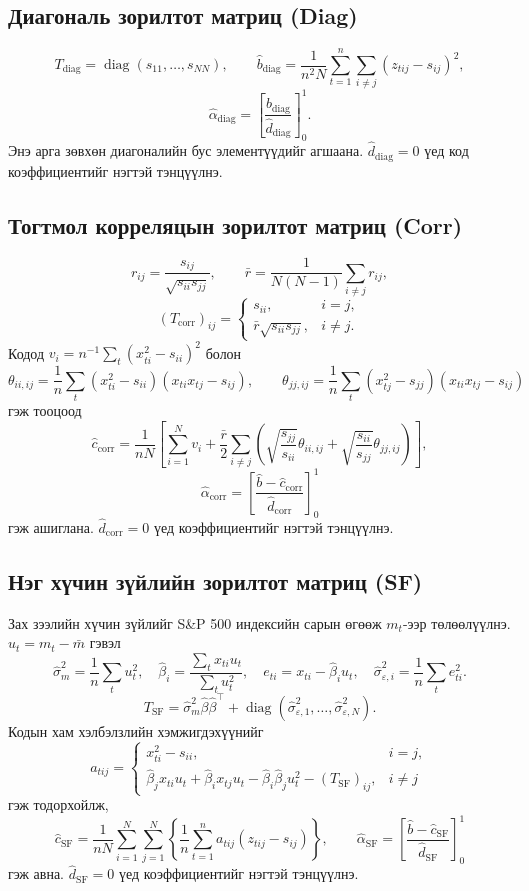 \subsection{Диагональ зорилтот матриц (Diag)}
\[
 T_{\mathrm{diag}}=\operatorname{diag}(s_{11},\ldots,s_{NN}),
 \qquad
 \widehat b_{\mathrm{diag}}=\frac{1}{n^2N}
 \sum_{t=1}^n\sum_{i\ne j}(z_{tij}-s_{ij})^2,
\]
\[
 \widehat\alpha_{\mathrm{diag}}=
 \left[\frac{\widehat b_{\mathrm{diag}}}
 {\widehat d_{\mathrm{diag}}}\right]_0^1.
\]
Энэ арга зөвхөн диагоналийн бус элементүүдийг агшаана.
$\widehat d_{\mathrm{diag}}=0$ үед код коэффициентийг
нэгтэй тэнцүүлнэ.

\subsection{Тогтмол корреляцын зорилтот матриц (Corr)}
\[
 r_{ij}=\frac{s_{ij}}{\sqrt{s_{ii}s_{jj}}},\qquad
 \bar r=\frac{1}{N(N-1)}\sum_{i\ne j}r_{ij},
\]
\[
 (T_{\mathrm{corr}})_{ij}=
 \begin{cases}s_{ii},&i=j,\\
 \bar r\sqrt{s_{ii}s_{jj}},&i\ne j.
 \end{cases}
\]
Кодод $v_i=n^{-1}\sum_t(x_{ti}^2-s_{ii})^2$ болон
\[
 \theta_{ii,ij}=\frac1n\sum_t(x_{ti}^2-s_{ii})
 (x_{ti}x_{tj}-s_{ij}),\qquad
 \theta_{jj,ij}=\frac1n\sum_t(x_{tj}^2-s_{jj})
 (x_{ti}x_{tj}-s_{ij})
\]
гэж тооцоод
\[
 \widehat c_{\mathrm{corr}}=\frac{1}{nN}
 \left[\sum_{i=1}^N v_i+
 \frac{\bar r}{2}\sum_{i\ne j}
 \left(\sqrt{\frac{s_{jj}}{s_{ii}}}\theta_{ii,ij}+
 \sqrt{\frac{s_{ii}}{s_{jj}}}\theta_{jj,ij}\right)\right],
\]
\[
 \widehat\alpha_{\mathrm{corr}}=
 \left[\frac{\widehat b-\widehat c_{\mathrm{corr}}}
 {\widehat d_{\mathrm{corr}}}\right]_0^1
\]
гэж ашиглана. $\widehat d_{\mathrm{corr}}=0$ үед
коэффициентийг нэгтэй тэнцүүлнэ.

\subsection{Нэг хүчин зүйлийн зорилтот матриц (SF)}
Зах зээлийн хүчин зүйлийг S\&P 500 индексийн сарын өгөөж
$m_t$-ээр төлөөлүүлнэ. $u_t=m_t-\bar m$ гэвэл
\[
 \widehat\sigma_m^2=\frac1n\sum_tu_t^2,\quad
 \widehat\beta_i=\frac{\sum_t x_{ti}u_t}{\sum_tu_t^2},\quad
 e_{ti}=x_{ti}-\widehat\beta_i u_t,\quad
 \widehat\sigma_{\varepsilon,i}^2=\frac1n\sum_te_{ti}^2.
\]
\[
 T_{\mathrm{SF}}=\widehat\sigma_m^2
 \widehat\beta\widehat\beta^\top+
 \operatorname{diag}(\widehat\sigma_{\varepsilon,1}^2,
 \ldots,\widehat\sigma_{\varepsilon,N}^2).
\]
Кодын хам хэлбэлзлийн хэмжигдэхүүнийг
\[
 a_{tij}=\begin{cases}
 x_{ti}^2-s_{ii},&i=j,\\
 \widehat\beta_j x_{ti}u_t+
 \widehat\beta_i x_{tj}u_t-
 \widehat\beta_i\widehat\beta_j u_t^2-
 (T_{\mathrm{SF}})_{ij},&i\ne j
 \end{cases}
\]
гэж тодорхойлж,
\[
 \widehat c_{\mathrm{SF}}=\frac{1}{nN}
 \sum_{i=1}^N\sum_{j=1}^N
 \left\{\frac1n\sum_{t=1}^n
 a_{tij}(z_{tij}-s_{ij})\right\},
 \qquad
 \widehat\alpha_{\mathrm{SF}}=
 \left[\frac{\widehat b-\widehat c_{\mathrm{SF}}}
 {\widehat d_{\mathrm{SF}}}\right]_0^1
\]
гэж авна. $\widehat d_{\mathrm{SF}}=0$ үед
коэффициентийг нэгтэй тэнцүүлнэ.

